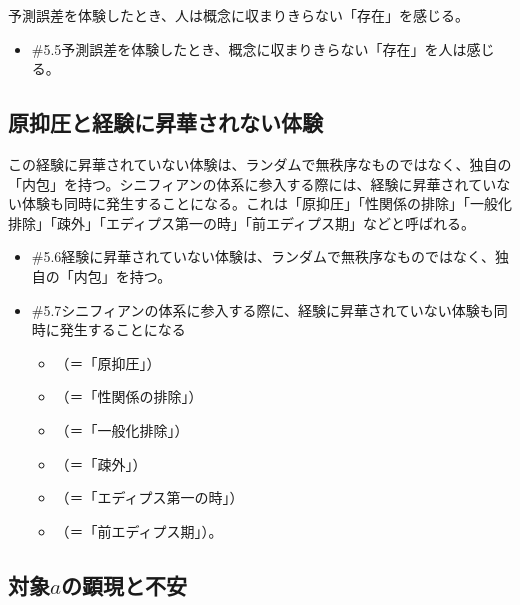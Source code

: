 予測誤差を体験したとき、人は概念に収まりきらない「存在」を感じる。

\begin{note}{}
  \begin{itemize}
    \tightlist
    \item{\#5.5}予測誤差を体験したとき、概念に収まりきらない「存在」を人は感じる。
  \end{itemize}
\end{note}

\subsection{原抑圧と経験に昇華されない体験}\label{ux539fux6291ux5727ux3068ux7d4cux9a13ux306bux6607ux83efux3055ux308cux306aux3044ux4f53ux9a13}

この経験に昇華されていない体験は、ランダムで無秩序なものではなく、独自の「内包」を持つ。シニフィアンの体系に参入する際には、経験に昇華されていない体験も同時に発生することになる。これは「原抑圧」「性関係の排除」「一般化排除」「疎外」「エディプス第一の時」「前エディプス期」などと呼ばれる。

\begin{note}{}
  \begin{itemize}
    \tightlist
    \item{\#5.6}経験に昇華されていない体験は、ランダムで無秩序なものではなく、独自の「内包」を持つ。
    \item{\#5.7}シニフィアンの体系に参入する際に、経験に昇華されていない体験も同時に発生することになる
      \begin{itemize}
        \tightlist
        \item （＝「原抑圧」）
        \item （＝「性関係の排除」）
        \item （＝「一般化排除」）
        \item （＝「疎外」）
        \item （＝「エディプス第一の時」）  
        \item （＝「前エディプス期」）。
      \end{itemize}
  \end{itemize}
\end{note}

\subsection{\texorpdfstring{対象\(a\)の顕現と不安}{対象aの顕現と不安}}\label{ux5bfeux8c61aux306eux9855ux73feux3068ux4e0dux5b89}

